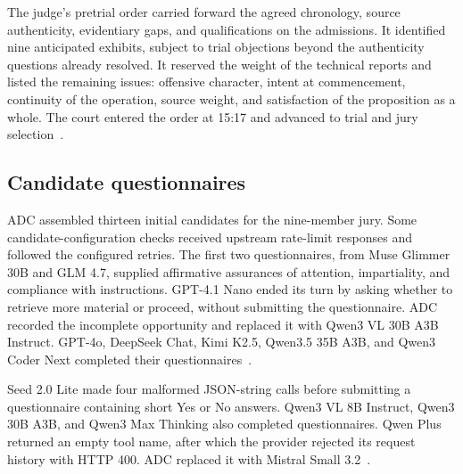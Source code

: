 \documentclass[11pt]{article}
\begin{document}
The judge's pretrial order carried forward the agreed chronology, source authenticity, evidentiary gaps, and qualifications on the admissions.  It identified nine anticipated exhibits, subject to trial objections beyond the authenticity questions already resolved.  It reserved the weight of the technical reports and listed the remaining issues: offensive character, intent at commencement, continuity of the operation, source weight, and satisfaction of the proposition as a whole.  The court entered the order at 15:17 and advanced to trial and jury selection~\cite[events 91--94]{record}.

\subsection{Candidate questionnaires}

ADC assembled thirteen initial candidates for the nine-member jury.  Some candidate-configuration checks received upstream rate-limit responses and followed the configured retries.  The first two questionnaires, from Muse Glimmer 30B and GLM 4.7, supplied affirmative assurances of attention, impartiality, and compliance with instructions.  GPT-4.1 Nano ended its turn by asking whether to retrieve more material or proceed, without submitting the questionnaire.  ADC recorded the incomplete opportunity and replaced it with Qwen3 VL 30B A3B Instruct.  GPT-4o, DeepSeek Chat, Kimi K2.5, Qwen3.5 35B A3B, and Qwen3 Coder Next completed their questionnaires~\cite[events 95--122 and juror process logs]{record}.

Seed 2.0 Lite made four malformed JSON-string calls before submitting a questionnaire containing short Yes or No answers.  Qwen3 VL 8B Instruct, Qwen3 30B A3B, and Qwen3 Max Thinking also completed questionnaires.  Qwen Plus returned an empty tool name, after which the provider rejected its request history with HTTP 400.  ADC replaced it with Mistral Small 3.2~\cite[events 123--134 and juror process logs]{record}.



\appendix

\end{document}
